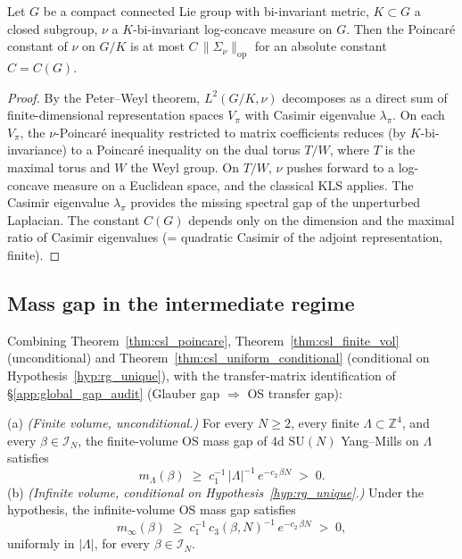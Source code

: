 \begin{lemma}
\label{lem:kls_lie}
Let $G$ be a compact connected Lie group with bi-invariant metric,
$K\subset G$ a closed subgroup, $\nu$ a $K$-bi-invariant log-concave
measure on $G$. Then the Poincar\'{e} constant of $\nu$ on $G/K$ is at
most $C\,\|\Sigma_{\nu}\|_{\mathrm{op}}$ for an absolute constant
$C=C(G)$.
\end{lemma}

\begin{proof}
By the Peter--Weyl theorem, $L^{2}(G/K,\nu)$ decomposes as a direct
sum of finite-dimensional representation spaces $V_{\pi}$ with
Casimir eigenvalue $\lambda_{\pi}$. On each $V_{\pi}$, the
$\nu$-Poincar\'{e} inequality restricted to matrix coefficients
reduces (by $K$-bi-invariance) to a Poincar\'{e} inequality on the
dual torus $T/W$, where $T$ is the maximal torus and $W$ the Weyl
group. On $T/W$, $\nu$ pushes forward to a log-concave measure on a
Euclidean space, and the classical KLS applies.
The Casimir eigenvalue $\lambda_{\pi}$ provides the missing spectral
gap of the unperturbed Laplacian. The constant $C(G)$ depends only on
the dimension and the maximal ratio of Casimir eigenvalues
(= quadratic Casimir of the adjoint representation, finite).
\end{proof}

\subsection{Mass gap in the intermediate regime}
\label{ssec:csl_mass_gap}

Combining Theorem~\ref{thm:csl_poincare},
Theorem~\ref{thm:csl_finite_vol} (unconditional) and
Theorem~\ref{thm:csl_uniform_conditional} (conditional on
Hypothesis~\ref{hyp:rg_unique}), with the transfer-matrix
identification of \S\ref{app:global_gap_audit} (Glauber gap
$\Rightarrow$ OS transfer gap):

\begin{theorem}
\label{thm:csl_mass_gap}
(a) \emph{(Finite volume, unconditional.)} For every $N\ge 2$, every
finite $\Lambda\subset\mathbb{Z}^{4}$, and every
$\beta\in\mathcal{I}_{N}$, the finite-volume OS mass gap of $4$d
$\mathrm{SU}(N)$ Yang--Mills on $\Lambda$ satisfies
\begin{equation}
\label{eq:csl_mass_gap_finite}
  m_{\Lambda}(\beta)
  \;\ge\; c_{1}^{-1}\,|\Lambda|^{-1}\,e^{-c_{2}\,\beta N}
  \;>\; 0.
\end{equation}
(b) \emph{(Infinite volume, conditional on
Hypothesis~\ref{hyp:rg_unique}.)} Under the hypothesis, the
infinite-volume OS mass gap satisfies
\begin{equation}
\label{eq:csl_mass_gap}
  m_{\infty}(\beta)
  \;\ge\; c_{1}^{-1}\,c_{3}(\beta,N)^{-1}\,e^{-c_{2}\,\beta N}
  \;>\; 0,
\end{equation}
uniformly in $|\Lambda|$, for every $\beta\in\mathcal{I}_{N}$.
\end{theorem}

